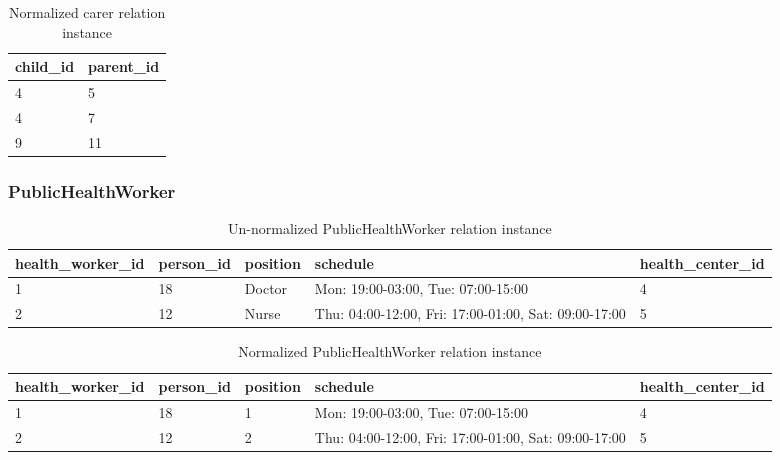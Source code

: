\documentclass{article}
\begin{document}
\begin{table}[H]
\centering
\begin{adjustbox}{width=0.2\textwidth,center=\textwidth}
\begin{tabular}{|l|l|} 
        \hline
        child\_id & parent\_id \\ 
        \hline
        4 & 5 \\
        4 & 7 \\
        9 & 11 \\
        \hline
\end{tabular}
\end{adjustbox}
\caption{Normalized carer relation instance}
\end{table}

\newpage
\subsubsection{PublicHealthWorker}
\begin{table}[ht]
\centering
\begin{adjustbox}{width=1\textwidth,center=\textwidth}
\begin{tabular}{|l|l|l|l|l|} 
        \hline
        health\_worker\_id & person\_id & position & schedule & health\_center\_id\\ 
        \hline
        1 & 18 & Doctor & Mon: 19:00-03:00, Tue: 07:00-15:00 & 4\\
        2 & 12 & Nurse & Thu: 04:00-12:00, Fri: 17:00-01:00, Sat: 09:00-17:00 & 5\\
        \hline
\end{tabular}
\end{adjustbox}
\caption{Un-normalized PublicHealthWorker relation instance}
\end{table}

\begin{table}[ht]
\centering
\begin{adjustbox}{width=1\textwidth,center=\textwidth}
\begin{tabular}{|l|l|l|l|l|} 
        \hline
        health\_worker\_id & person\_id & position & schedule & health\_center\_id\\ 
        \hline
        1 & 18 & 1 & Mon: 19:00-03:00, Tue: 07:00-15:00 & 4\\
        2 & 12 & 2 & Thu: 04:00-12:00, Fri: 17:00-01:00, Sat: 09:00-17:00 & 5\\
        \hline
\end{tabular}
\end{adjustbox}
\caption{Normalized PublicHealthWorker relation instance}
\end{table}
\end{document}
